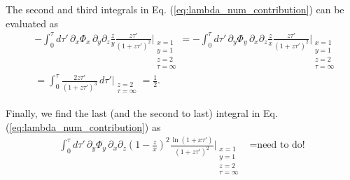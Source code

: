 \documentclass[11pt]{article}
\begin{document}
The second and third integrals in Eq. (\ref{eq:lambda_num_contribution}) can be evaluated as \begin{align}
    & -\int_0^{\tau} d\tau'\, \partial_x \Phi_x \, \partial_y \partial_z \frac{z}{y} \frac{z\tau'}{(1+z\tau')^2} \Bigg\vert_{\substack{x=1 \\ y=1 \\ z=2 \\ \tau=\infty}} = -\int_0^{\tau} d\tau'\, \partial_y \Phi_y \, \partial_x \partial_z \frac{z}{x} \frac{z\tau'}{(1+z\tau')^2} \Bigg\vert_{\substack{x=1 \\ y=1 \\ z=2 \\ \tau=\infty}} \\\nonumber
    &= \int_0^{\tau} \frac{2z\tau'}{(1+z\tau')^3} \,d\tau'\Bigg\vert_{\substack{z=2 \\ \tau=\infty}} = \frac{1}{2}.
\end{align}

Finally, we find the last (and the second to last) integral in Eq. (\ref{eq:lambda_num_contribution}) as
\begin{align}
    \int_0^{\tau} d\tau'\, \partial_y \Phi_y \, \partial_x \partial_z \left(1-\frac{z}{x}\right)^2 \frac{\ln(1+x\tau')}{(1+z\tau')^2} \Bigg\vert_{\substack{x=1 \\ y=1 \\ z=2 \\ \tau=\infty}} &= \textrm{need to do!} 
\end{align}
\end{document}
